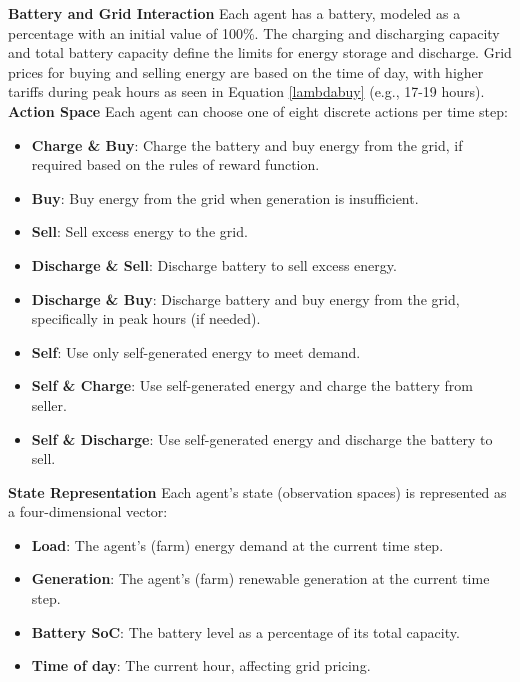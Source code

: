 \documentclass[preprint,12pt]{elsarticle}
\begin{document}
\textbf{Battery and Grid Interaction}
Each agent has a battery, modeled as a percentage with an initial value of 100\%. The charging and discharging capacity and total battery capacity define the limits for energy storage and discharge. Grid prices for buying and selling energy are based on the time of day, with higher tariffs during peak hours as seen in Equation \ref{lambdabuy} (e.g., 17-19 hours).\\

\textbf{Action Space}
Each agent can choose one of eight discrete actions per time step:
\begin{itemize}
    \item \textbf{Charge \& Buy}: Charge the battery and buy energy from the grid, if required based on the rules of reward function.
    \item \textbf{Buy}: Buy energy from the grid when generation is insufficient.
    \item \textbf{Sell}: Sell excess energy to the grid.
    \item \textbf{Discharge \& Sell}: Discharge battery to sell excess energy.
    \item \textbf{Discharge \& Buy}: Discharge battery and buy energy from the grid, specifically in peak hours (if needed).
    \item \textbf{Self}: Use only self-generated energy to meet demand.
    \item \textbf{Self \& Charge}: Use self-generated energy and charge the battery from seller.
    \item \textbf{Self \& Discharge}: Use self-generated energy and discharge the battery to sell.
\end{itemize}

\textbf{State Representation}
Each agent's state (observation spaces) is represented as a four-dimensional vector:
\begin{itemize}
    \item \textbf{Load}: The agent's (farm) energy demand at the current time step.
    \item \textbf{Generation}: The agent's (farm) renewable generation at the current time step.
    \item \textbf{Battery SoC}: The battery level as a percentage of its total capacity.
    \item \textbf{Time of day}: The current hour, affecting grid pricing.
\end{itemize}


\section{}
\label{statestransition}
\end{document}
